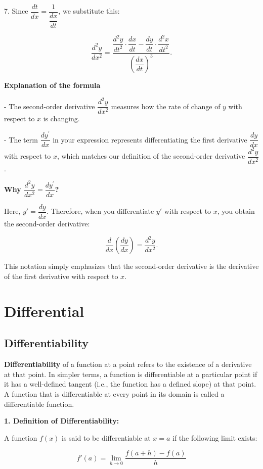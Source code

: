\documentclass[a4paper,12pt]{book}
\begin{document}
7. Since \( \dfrac{dt}{dx} = \dfrac{1}{\dfrac{dx}{dt}} \), we substitute this:

   \[
   \dfrac{d^2y}{dx^2} = \dfrac{\dfrac{d^2y}{dt^2} \cdot \dfrac{dx}{dt} - \dfrac{dy}{dt} \cdot \dfrac{d^2x}{dt^2}}{\left( \dfrac{dx}{dt} \right)^3}.
   \]

\textbf{Explanation of the formula}

- The second-order derivative \( \dfrac{d^2y}{dx^2} \) measures how the rate of change of \( y \) with respect to \( x \) is changing.

- The term \( \dfrac{d y^{\prime}}{dx} \) in your expression represents differentiating the first derivative \( \dfrac{dy}{dx} \) with respect to \( x \), which matches our definition of the second-order derivative \( \dfrac{d^2y}{dx^2} \).

\textbf{Why \( \dfrac{d^2y}{dx^2} = \dfrac{d y^{\prime}}{dx} \)?}

Here, \( y' = \dfrac{dy}{dx} \). Therefore, when you differentiate \( y' \) with respect to \( x \), you obtain the second-order derivative:

  \[
  \dfrac{d}{dx} \left( \dfrac{dy}{dx} \right) = \dfrac{d^2y}{dx^2}.
  \]

This notation simply emphasizes that the second-order derivative is the derivative of the first derivative with respect to \( x \).

\chapter{Differential}

\section{Differentiability}

\textbf{Differentiability} of a function at a point refers to the existence of a derivative at that point. In simpler terms, a function is differentiable at a particular point if it has a well-defined tangent (i.e., the function has a defined slope) at that point. A function that is differentiable at every point in its domain is called a differentiable function.

\textbf{1. Definition of Differentiability:}

A function \( f(x) \) is said to be differentiable at \( x = a \) if the following limit exists:

\[
f'(a) = \lim_{h \to 0} \dfrac{f(a + h) - f(a)}{h}
\]
\end{document}
